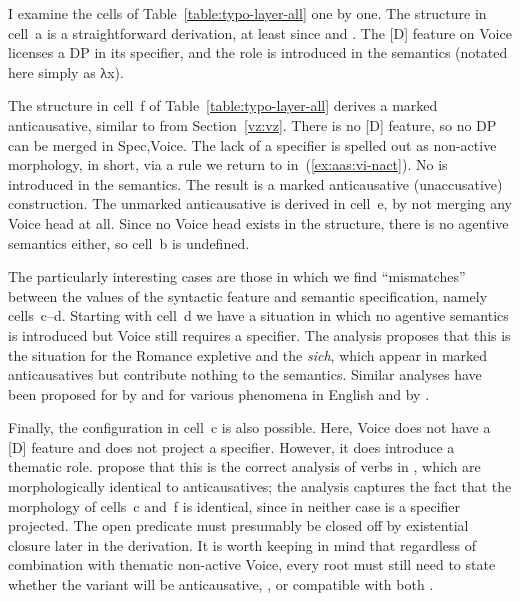 \begin{exe}
\begin{xlist}
\begin{exe}
\begin{exe}
\begin{xlist}
\begin{exe}
I examine the cells of Table~\ref{table:typo-layer-all} one by one. The structure in cell~a is a straightforward  derivation, at least since \cite{kratzer96} and \cite{pylkkanen08}. The [D] feature on Voice licenses a DP in its specifier, and the  role is introduced in the semantics (notated here simply as λx).

The structure in cell~f of Table~\ref{table:typo-layer-all} derives a marked anticausative, similar to {\tnif} from Section~\ref{vz:vz}. There is no [D] feature, so no DP can be merged in Spec,Voice. The lack of a specifier is spelled out as non-active morphology,  in short, via a rule we return to in~(\ref{ex:aas:vi-nact}). No  is introduced in the semantics. The result is a marked anticausative (unaccusative) construction. The unmarked anticausative is derived in cell~e, by not merging any Voice head at all. Since no Voice head exists in the structure, there is no agentive semantics either, so cell~b is undefined.

The particularly interesting cases are those in which we find ``mismatches'' between the values of the syntactic feature and semantic specification, namely cells~c--d. Starting with cell~d we have a situation in which no agentive semantics is introduced but Voice still requires a specifier. The  analysis proposes that this is the situation for the Romance expletive  and the  \emph{sich}, which appear in marked anticausatives but contribute nothing to the semantics. Similar analyses have been proposed for  by \cite{wood14nllt,wood15springer} and for various phenomena in English and  by \cite{myler16mit}.

Finally, the configuration in cell~c is also possible. Here, Voice does not have a [D] feature and does not project a specifier. However, it does introduce a thematic role. \cite{layering15} propose that this is the correct analysis of  verbs in , which are morphologically identical to anticausatives; the analysis captures the fact that the morphology of cells~c and~f is identical, since in neither case is a specifier projected. The open predicate must presumably be closed off by existential closure later in the derivation. It is worth keeping in mind that regardless of combination with thematic non-active Voice, every root must still need to state whether the  variant will be anticausative, , or compatible with both \citep[88]{alexiadouanagnostopoulou04,layering15}.



\end{exe}
\end{xlist}
\end{exe}
\end{exe}
\end{xlist}
\end{exe}
